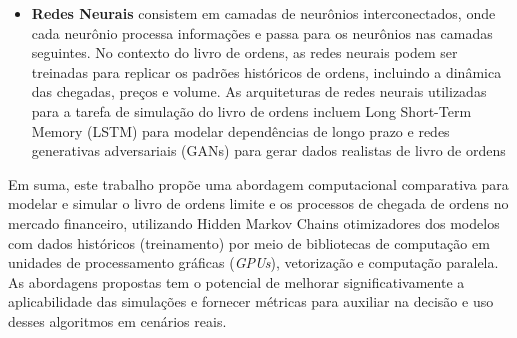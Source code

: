 \begin{itemize}
	\item \textbf{Redes Neurais} consistem em camadas de neurônios interconectados, onde cada neurônio processa informações e passa para os neurônios nas camadas seguintes. No contexto do livro de ordens, as redes neurais podem ser treinadas para replicar os padrões históricos de ordens, incluindo a dinâmica das chegadas, preços e volume. As arquiteturas de redes neurais utilizadas para a tarefa de simulação do livro de ordens incluem Long Short-Term Memory (LSTM) para modelar dependências de longo prazo \citep{Shi2022} e redes generativas adversariais (GANs) para gerar dados realistas de livro de ordens \citep{Coletta2022, Cont2022}
	
\end{itemize}

Em suma, este trabalho propõe uma abordagem computacional comparativa para modelar e simular o livro de ordens limite e os processos de chegada de ordens no mercado financeiro, utilizando Hidden Markov Chains otimizadores dos modelos com dados históricos (treinamento) por meio de bibliotecas de computação em unidades de processamento gráficas (\textit{GPUs}), vetorização e computação paralela. As abordagens propostas tem o potencial de melhorar significativamente a aplicabilidade das simulações e fornecer métricas para auxiliar na decisão e uso desses algoritmos em cenários reais.
